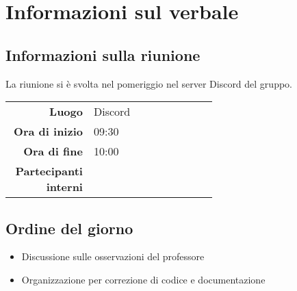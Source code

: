 \section{Informazioni sul verbale}

\subsection{Informazioni sulla riunione}
La riunione si è svolta nel pomeriggio nel server Discord del gruppo.

\begin{center}
	\begin{tabular}{r|p{0.6\linewidth}}
		\toprule
		\textbf{Luogo} & Discord \\
		\textbf{Ora di inizio} & 09:30 \\
		\textbf{Ora di fine} & 10:00 \\
		\textbf{Partecipanti interni} & \groupTeam
	\end{tabular}
\end{center}

\medskip

\subsection{Ordine del giorno}
\begin{itemize}
	\item Discussione sulle osservazioni del professore
	\item Organizzazione per correzione di codice e documentazione
\end{itemize}